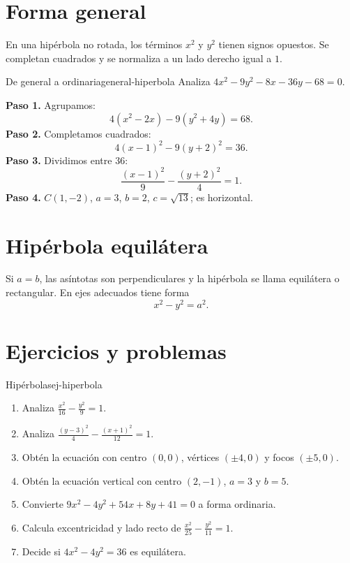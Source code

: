 \section{Forma general}

En una hipérbola no rotada, los términos $x^2$ y $y^2$ tienen signos
opuestos. Se completan cuadrados y se normaliza a un lado derecho igual a $1$.

\begin{example}{De general a ordinaria}{general-hiperbola}
Analiza $4x^2-9y^2-8x-36y-68=0$.
\begin{solution}
\textbf{Paso 1.} Agrupamos:
\[
4(x^2-2x)-9(y^2+4y)=68.
\]
\textbf{Paso 2.} Completamos cuadrados:
\[
4(x-1)^2-9(y+2)^2=36.
\]
\textbf{Paso 3.} Dividimos entre $36$:
\[
\frac{(x-1)^2}{9}-\frac{(y+2)^2}{4}=1.
\]
\textbf{Paso 4.} $C(1,-2)$, $a=3$, $b=2$, $c=\sqrt{13}$; es horizontal.
\end{solution}
\end{example}

\section{Hipérbola equilátera}

Si $a=b$, las asíntotas son perpendiculares y la hipérbola se llama
equilátera o rectangular. En ejes adecuados tiene forma
\[
x^2-y^2=a^2.
\]

\section{Ejercicios y problemas}

\begin{exercise}{Hipérbolas}{ej-hiperbola}
\begin{enumerate}
  \item Analiza $\frac{x^2}{16}-\frac{y^2}{9}=1$.
  \item Analiza $\frac{(y-3)^2}{4}-\frac{(x+1)^2}{12}=1$.
  \item Obtén la ecuación con centro $(0,0)$, vértices $(\pm4,0)$ y focos
  $(\pm5,0)$.
  \item Obtén la ecuación vertical con centro $(2,-1)$, $a=3$ y $b=5$.
  \item Convierte $9x^2-4y^2+54x+8y+41=0$ a forma ordinaria.
  \item Calcula excentricidad y lado recto de $\frac{x^2}{25}-\frac{y^2}{11}=1$.
  \item Decide si $4x^2-4y^2=36$ es equilátera.
\end{enumerate}
\end{exercise}

